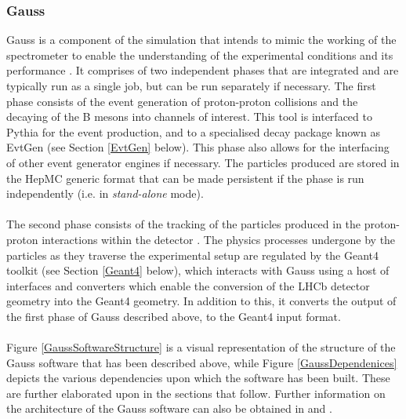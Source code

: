 \subsubsection{Gauss}
Gauss is a component of the simulation that intends to mimic the working of the spectrometer to enable the understanding of the experimental conditions and its performance \cite{Tlustos:913827}.
It comprises of two independent phases that are integrated and are typically run as a single job, but can be run separately if necessary. The first phase consists of the event generation
of proton-proton collisions and the decaying of the B mesons into channels of interest. This tool is interfaced to Pythia for the event production, and to a specialised decay package known as
EvtGen (see Section \ref{EvtGen} below). This phase also allows for the interfacing of other event generator engines if necessary. The particles produced are stored in the HepMC \cite{BUCKLEY2021107310} generic format that can be made persistent if the 
phase is run independently (i.e. in \textit{stand-alone} mode).\\
\\
The second phase consists of the tracking of the particles produced in the proton-proton interactions within the detector \cite{Belyaev_2011}. The physics processes undergone by the particles as they traverse the experimental setup are
regulated by the Geant4 toolkit (see Section \ref{Geant4} below), which interacts with Gauss using a host of interfaces and converters which enable the conversion of the LHCb detector geometry into the Geant4 geometry. In addition to this, it converts the output of the first phase of Gauss described above, to the Geant4 input format.\\
\\
Figure \ref{GaussSoftwareStructure} is a visual representation of the structure of the Gauss software that has been described above, while Figure \ref{GaussDependenices} depicts the various dependencies upon which the software has been built. These are further elaborated upon in the sections that follow. Further information on the architecture of the
Gauss software can also be obtained in \cite{Belyaev_2011} and \cite{Tlustos:913827}.
